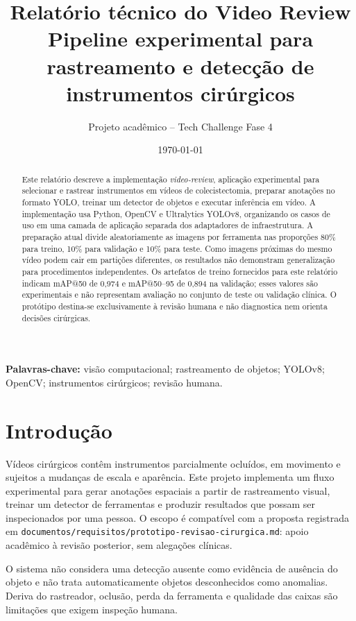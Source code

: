 \documentclass[12pt,a4paper]{article}
\title{\textbf{Relatório técnico do Video Review}\\
\large Pipeline experimental para rastreamento e detecção de instrumentos cirúrgicos}
\author{Projeto acadêmico -- Tech Challenge Fase 4}
\date{\today}
\begin{document}
\maketitle

\begin{abstract}
Este relatório descreve a implementação \textit{video-review}, aplicação experimental para selecionar e rastrear instrumentos em vídeos de colecistectomia, preparar anotações no formato YOLO, treinar um detector de objetos e executar inferência em vídeo. A implementação usa Python, OpenCV e Ultralytics YOLOv8, organizando os casos de uso em uma camada de aplicação separada dos adaptadores de infraestrutura. A preparação atual divide aleatoriamente as imagens por ferramenta nas proporções 80\% para treino, 10\% para validação e 10\% para teste. Como imagens próximas do mesmo vídeo podem cair em partições diferentes, os resultados não demonstram generalização para procedimentos independentes. Os artefatos de treino fornecidos para este relatório indicam mAP@50 de 0,974 e mAP@50--95 de 0,894 na validação; esses valores são experimentais e não representam avaliação no conjunto de teste ou validação clínica. O protótipo destina-se exclusivamente à revisão humana e não diagnostica nem orienta decisões cirúrgicas.
\end{abstract}

\noindent\textbf{Palavras-chave:} visão computacional; rastreamento de objetos; YOLOv8; OpenCV; instrumentos cirúrgicos; revisão humana.

\section{Introdução}

Vídeos cirúrgicos contêm instrumentos parcialmente ocluídos, em movimento e sujeitos a mudanças de escala e aparência. Este projeto implementa um fluxo experimental para gerar anotações espaciais a partir de rastreamento visual, treinar um detector de ferramentas e produzir resultados que possam ser inspecionados por uma pessoa. O escopo é compatível com a proposta registrada em \texttt{documentos/requisitos/prototipo-revisao-cirurgica.md}: apoio acadêmico à revisão posterior, sem alegações clínicas.

O sistema não considera uma detecção ausente como evidência de ausência do objeto e não trata automaticamente objetos desconhecidos como anomalias. Deriva do rastreador, oclusão, perda da ferramenta e qualidade das caixas são limitações que exigem inspeção humana.
\end{document}
